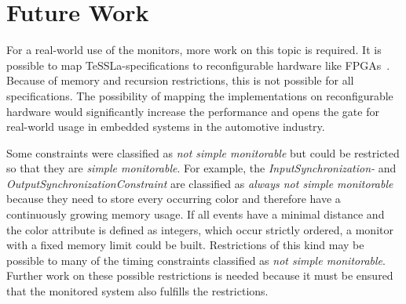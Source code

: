 \section{Future Work}
	For a real-world use of the monitors, more work on this topic is required. It is possible to map TeSSLa-specifications to reconfigurable hardware like FPGAs~\cite{8342124}. Because of memory and recursion restrictions, this is not possible for all specifications. %
	The possibility of mapping the implementations on reconfigurable hardware would significantly increase the performance and opens the gate for real-world usage in embedded systems in the automotive industry. 
	
	Some constraints were classified as \textit{not simple monitorable} but could be restricted so that they are \textit{simple monitorable}. For example, the \textit{InputSynchronization-} and \textit{OutputSynchronizationConstraint} are classified as \textit{always not simple monitorable} because they need to store every occurring color and therefore have a continuously growing memory usage. If all events have a minimal distance and the color attribute is defined as integers, which occur strictly ordered, a monitor with a fixed memory limit could be built. Restrictions of this kind may be possible to many of the timing constraints classified as \textit{not simple monitorable}. Further work on these possible restrictions is needed because it must be ensured that the monitored system also fulfills the restrictions.





